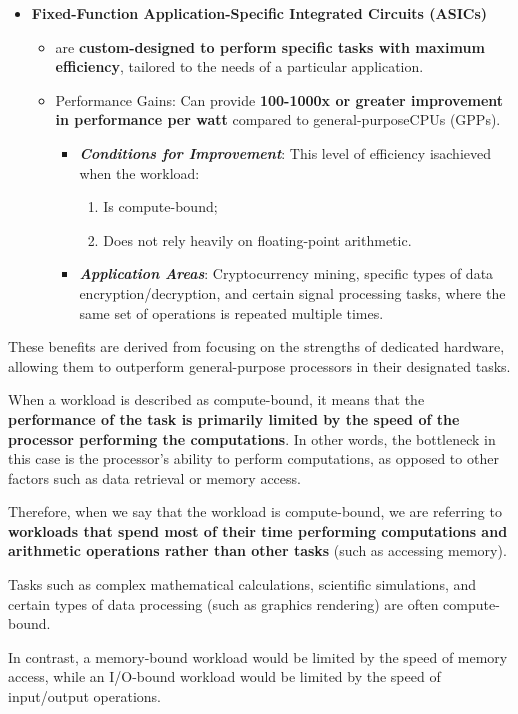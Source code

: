 \begin{itemize}[label=\textcolor{Green3}{}]
    \item \textcolor{Green3}{\textbf{Fixed-Function Application-Specific Integrated Circuits (ASICs)}}
    \begin{itemize}
        \item[\textcolor{Green3}{\faIcon{book}}]  are \textbf{custom-designed to perform specific tasks with maximum efficiency}, tailored to the needs of a particular application.
        \item[\textcolor{Green3}{\faIcon{tachometer-alt}}] Performance Gains: Can provide \textbf{100-1000x or greater improvement in performance per watt} compared to general-purpose\break CPUs (GPPs).
        \begin{itemize}
            \item \textbf{\emph{Conditions for Improvement}}: This level of efficiency is\break achieved when the workload:
            \begin{enumerate}
                \item Is compute-bound;
                \item Does not rely heavily on floating-point arithmetic.
            \end{enumerate}
            \item \textbf{\emph{Application Areas}}: Cryptocurrency mining, specific types of data encryption/decryption, and certain signal processing tasks, where the same set of operations is repeated multiple times.
        \end{itemize}
    \end{itemize}
\end{itemize}
These benefits are derived from focusing on the strengths of dedicated hardware, allowing them to outperform general-purpose processors in their designated tasks.

\begin{remarkbox}
    When a workload is described as compute-bound, it means that the \textbf{performance of the task is primarily limited by the speed of the processor performing the computations}. In other words, the bottleneck in this case is the processor's ability to perform computations, as opposed to other factors such as data retrieval or memory access.

    \highspace
    Therefore, when we say that the workload is compute-bound, we are referring to \textbf{workloads that spend most of their time performing computations and arithmetic operations rather than other tasks} (such as accessing memory).

    \highspace
    Tasks such as complex mathematical calculations, scientific simulations, and certain types of data processing (such as graphics rendering) are often compute-bound.

    \highspace
    In contrast, a memory-bound workload would be limited by the speed of memory access, while an I/O-bound workload would be limited by the speed of input/output operations.
\end{remarkbox}

